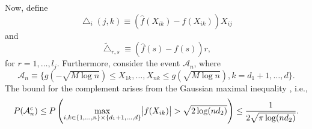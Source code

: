 Now, define
\begin{equation*}
    \bigtriangleup_i(j,k) \equiv (\hat{f}(X_{ik}) - f(X_{ik}))X_{ij}
\end{equation*}
and
\begin{equation*}
    \tilde{\bigtriangleup}_{r,s} \equiv (\hat{f}(s) - f(s))r,
\end{equation*}
for $r = 1, \dots, l_{j}$. Furthermore, consider the event $\mathcal{A}_n$, where
\begin{equation*}
    \mathcal{A}_n \equiv \{g(-\sqrt{M\log n}) \leq X_{1k}, \dots, X_{nk} \leq g(\sqrt{M\log n}), k = d_1 + 1, \dots, d\}.
\end{equation*}
The bound for the complement arises from the Gaussian maximal inequality \citep[Lemma 13]{Liu09}, i.e.,
\begin{equation*}
    P(\mathcal{A}_n^c) \leq P\left(\max_{i,k\in \{1,\dots,n\}\times\{d_1+1, \dots, d\}} \abs{f(X_{ik})} > \sqrt{2\log(nd_2)}\right) \leq \frac{1}{2\sqrt{\pi\log(nd_2)}}.
\end{equation*}

